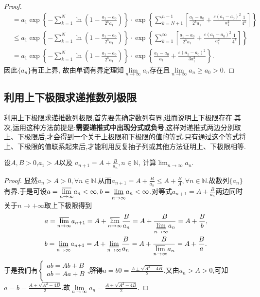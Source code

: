 \documentclass[../../main.tex]{subfiles}%
\begin{document}
\begin{proof}
\begin{align*}
&= a_1\exp\left\{ -\sum\limits_{k=1}^N \ln\left( 1-\frac{a_1-a_0}{2^k a_1} \right) \right\} \cdot \exp\left\{ \sum\limits_{k=N+1}^{n-1} \left[ \frac{a_1-a_0}{2^k a_1}+\frac{\varepsilon \left( a_1-a_0 \right)^2}{a_1^2}\frac{1}{4^k} \right] \right\} \\
&\leqslant a_1\exp\left\{ -\sum\limits_{k=1}^N \ln\left( 1-\frac{a_1-a_0}{2^k a_1} \right) \right\} \cdot \exp\left\{ \sum\limits_{k=1}^{\infty} \left[ \frac{a_1-a_0}{2^k a_1}+\frac{\varepsilon \left( a_1-a_0 \right)^2}{a_1^2}\frac{1}{4^k} \right] \right\} \\
&= a_1\exp\left\{ -\sum\limits_{k=1}^N \ln\left( 1-\frac{a_1-a_0}{2^k a_1} \right) \right\} \cdot \exp\left\{ \frac{a_1-a_0}{a_1}+\frac{\varepsilon \left( a_1-a_0 \right)^2}{3a_1^2} \right\}.
\end{align*}
因此$\{a_n\}$有正上界, 故由单调有界定理知$\lim\limits_{n\rightarrow \infty}a_n$存在且$\lim\limits_{n\rightarrow \infty}a_n\geqslant a_0>0$.
\end{proof}



\subsection{利用上下极限求递推数列极限}

利用上下极限求递推数列极限,首先要先确定数列有界,进而说明上下极限存在.其次,运用这种方法前提是:\textbf{需要递推式中出现分式或负号},这样对递推式两边分别取上、下极限后,才会得到一个关于上极限和下极限的值的等式.只有通过这个等式将上、下极限的值联系起来后,才能利用反复抽子列或其他方法证明上、下极限相等.

\begin{example}
设\(A,B > 0\),\(a_1 > A\)以及
\(a_{n + 1} = A + \frac{B}{a_n}, n \in \mathbb{N}\),
计算\(\lim_{n \to \infty} a_n\).
\end{example}
\begin{proof}
显然$a_n>A>0,\forall n\in\mathbb{N}$.从而$a_{n+1}=A+\frac{B}{a_n}\leqslant  A+\frac{B}{A},\forall n\in\mathbb{N}$.故数列$\{a_n\}$有界.于是可设$a=\underset{n\rightarrow \infty}{{\varlimsup }}a_n<\infty,b=\underset{n\rightarrow \infty}{{\varliminf }}a_n<\infty$.对等式$a_{n + 1} = A + \frac{B}{a_n}$两边同时关于$n\to+\infty$取上下极限得到
\begin{align*}
&a=\underset{n\rightarrow \infty}{{\varlimsup }}a_{n+1}=A+\underset{n\rightarrow \infty}{{\varlimsup }}\frac{B}{a_n}=A+\frac{B}{\underset{n\rightarrow \infty}{{\varliminf }}a_n}=A+\frac{B}{b},
\\
&b=\underset{n\rightarrow \infty}{{\varliminf }}a_{n+1}=A+\underset{n\rightarrow \infty}{{\varliminf }}\frac{B}{a_n}=A+\frac{B}{\underset{n\rightarrow \infty}{{\varlimsup }}a_n}=A+\frac{B}{a}.
\end{align*}
于是我们有$\begin{cases}
ab=Ab+B\\
ab=Aa+B\\
\end{cases}$,解得$a=b0=\frac{A\pm\sqrt{A^2-4B}}{2}$.又由$a_n>A>0$,可知$a=b=\frac{A+\sqrt{A^2-4B}}{2}$.故$\underset{n\rightarrow \infty}{\lim}a_n=\frac{A+\sqrt{A^2-4B}}{2}$.
\end{proof}
\end{document}
